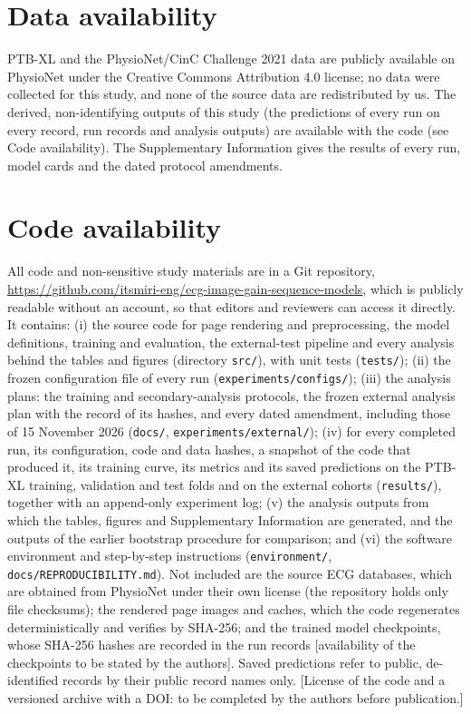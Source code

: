 \documentclass{wlscirep}
\begin{document}
\section*{Data availability}
PTB-XL and the PhysioNet/CinC Challenge 2021 data are publicly available on PhysioNet under the Creative Commons Attribution 4.0 license; no data were collected for this study, and none of the source data are redistributed by us. The derived, non-identifying outputs of this study (the predictions of every run on every record, run records and analysis outputs) are available with the code (see Code availability). The Supplementary Information gives the results of every run, model cards and the dated protocol amendments.

\section*{Code availability}
All code and non-sensitive study materials are in a Git repository, \url{https://github.com/itsmiri-eng/ecg-image-gain-sequence-models}, which is publicly readable without an account, so that editors and reviewers can access it directly. It contains: (i) the source code for page rendering and preprocessing, the model definitions, training and evaluation, the external-test pipeline and every analysis behind the tables and figures (directory \texttt{src/}), with unit tests (\texttt{tests/}); (ii) the frozen configuration file of every run (\texttt{experiments/configs/}); (iii) the analysis plans: the training and secondary-analysis protocols, the frozen external analysis plan with the record of its hashes, and every dated amendment, including those of 15 November 2026 (\texttt{docs/}, \texttt{experiments/external/}); (iv) for every completed run, its configuration, code and data hashes, a snapshot of the code that produced it, its training curve, its metrics and its saved predictions on the PTB-XL training, validation and test folds and on the external cohorts (\texttt{results/}), together with an append-only experiment log; (v) the analysis outputs from which the tables, figures and Supplementary Information are generated, and the outputs of the earlier bootstrap procedure for comparison; and (vi) the software environment and step-by-step instructions (\texttt{environment/}, \texttt{docs/REPRODUCIBILITY.md}). Not included are the source ECG databases, which are obtained from PhysioNet under their own license (the repository holds only file checksums); the rendered page images and caches, which the code regenerates deterministically and verifies by SHA-256; and the trained model checkpoints, whose SHA-256 hashes are recorded in the run records [availability of the checkpoints to be stated by the authors]. Saved predictions refer to public, de-identified records by their public record names only. [License of the code and a versioned archive with a DOI: to be completed by the authors before publication.]
\end{document}
